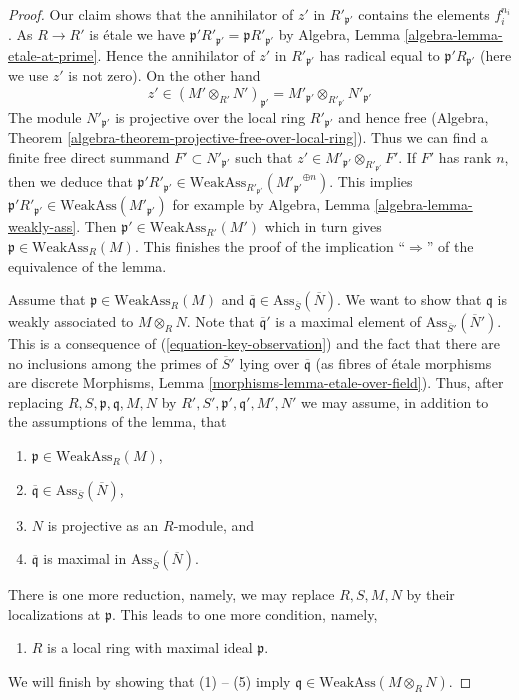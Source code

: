 \documentclass[10pt,a4paper]{amsart}
\theoremstyle{plain}
\theoremstyle{definition}
\theoremstyle{remark}
\numberwithin{equation}{subsection}
\begin{document}
\begin{proof}
\medskip\noindent
Our claim shows that the annihilator of $z'$ in $R'_{\mathfrak p'}$
contains the elements $f_i^{n_i}$. As $R \to R'$ is \'etale we have
$\mathfrak p'R'_{\mathfrak p'} = \mathfrak pR'_{\mathfrak p'}$
by Algebra, Lemma \ref{algebra-lemma-etale-at-prime}.
Hence the annihilator of $z'$ in $R'_{\mathfrak p'}$ has radical equal to
$\mathfrak p' R_{\mathfrak p'}$ (here we use $z'$ is not zero).
On the other hand
$$
z' \in (M' \otimes_{R'} N')_{\mathfrak p'} =
M'_{\mathfrak p'} \otimes_{R'_{\mathfrak p'}} N'_{\mathfrak p'}
$$
The module $N'_{\mathfrak p'}$ is projective over the local ring
$R'_{\mathfrak p'}$ and hence free
(Algebra, Theorem \ref{algebra-theorem-projective-free-over-local-ring}).
Thus we can find a finite free direct summand $F' \subset N'_{\mathfrak p'}$
such that $z' \in M'_{\mathfrak p'} \otimes_{R'_{\mathfrak p'}} F'$.
If $F'$ has rank $n$, then we deduce that
$\mathfrak p' R'_{\mathfrak p'} \in
\text{WeakAss}_{R'_{\mathfrak p'}}({M'_{\mathfrak p'}}^{\oplus n})$.
This implies
$\mathfrak p'R'_{\mathfrak p'} \in \text{WeakAss}(M'_{\mathfrak p'})$
for example by Algebra, Lemma \ref{algebra-lemma-weakly-ass}.
Then $\mathfrak p' \in \text{WeakAss}_{R'}(M')$
which in turn gives $\mathfrak p \in \text{WeakAss}_R(M)$.
This finishes the proof of the implication
``$\Rightarrow$'' of the equivalence of the lemma.

\medskip\noindent
Assume that $\mathfrak p \in \text{WeakAss}_R(M)$ and
$\overline{\mathfrak q} \in \text{Ass}_{\overline{S}}(\overline{N})$.
We want to show that $\mathfrak q$ is weakly associated to $M \otimes_R N$.
Note that $\overline{\mathfrak q}'$ is a maximal element of
$\text{Ass}_{\overline{S}'}(\overline{N}')$.
This is a consequence of (\ref{equation-key-observation})
and the fact that there are no inclusions among the primes
of $\overline{S}'$ lying over $\overline{\mathfrak q}$
(as fibres of \'etale morphisms are discrete
Morphisms, Lemma \ref{morphisms-lemma-etale-over-field}).
Thus, after replacing $R, S, \mathfrak p, \mathfrak q, M, N$ by
$R', S', \mathfrak p', \mathfrak q', M', N'$
we may assume, in addition to the assumptions of the lemma, that
\begin{enumerate}
\item $\mathfrak p \in \text{WeakAss}_R(M)$,
\item $\overline{\mathfrak q} \in \text{Ass}_{\overline{S}}(\overline{N})$,
\item $N$ is projective as an $R$-module, and
\item $\overline{\mathfrak q}$ is maximal in
$\text{Ass}_{\overline{S}}(\overline{N})$.
\end{enumerate}
There is one more reduction, namely, we may replace
$R, S, M, N$ by their localizations at $\mathfrak p$.
This leads to one more condition, namely,
\begin{enumerate}
\item[(5)] $R$ is a local ring with maximal ideal $\mathfrak p$.
\end{enumerate}
We will finish by showing that (1) -- (5) imply
$\mathfrak q \in \text{WeakAss}(M \otimes_R N)$.


\end{proof}
\end{document}
